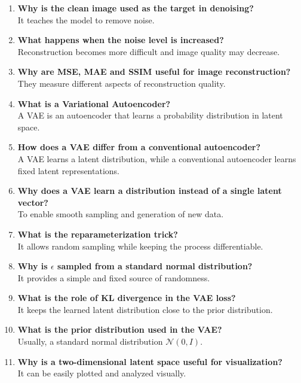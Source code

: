 \documentclass[10pt]{article}
\begin{document}
\begin{enumerate}
\item \textbf{Why is the clean image used as the target in denoising?}\\
It teaches the model to remove noise.

\item \textbf{What happens when the noise level is increased?}\\
Reconstruction becomes more difficult and image quality may decrease.

\item \textbf{Why are MSE, MAE and SSIM useful for image reconstruction?}\\
They measure different aspects of reconstruction quality.

\item \textbf{What is a Variational Autoencoder?}\\
A VAE is an autoencoder that learns a probability distribution in latent space.

\item \textbf{How does a VAE differ from a conventional autoencoder?}\\
A VAE learns a latent distribution, while a conventional autoencoder learns fixed latent representations.

\item \textbf{Why does a VAE learn a distribution instead of a single latent vector?}\\
To enable smooth sampling and generation of new data.

\item \textbf{What is the reparameterization trick?}\\
It allows random sampling while keeping the process differentiable.

\item \textbf{Why is $\epsilon$ sampled from a standard normal distribution?}\\
It provides a simple and fixed source of randomness.

\item \textbf{What is the role of KL divergence in the VAE loss?}\\
It keeps the learned latent distribution close to the prior distribution.

\item \textbf{What is the prior distribution used in the VAE?}\\
Usually, a standard normal distribution $\mathcal{N}(0,I)$.

\item \textbf{Why is a two-dimensional latent space useful for visualization?}\\
It can be easily plotted and analyzed visually.


\end{enumerate}
\end{document}
